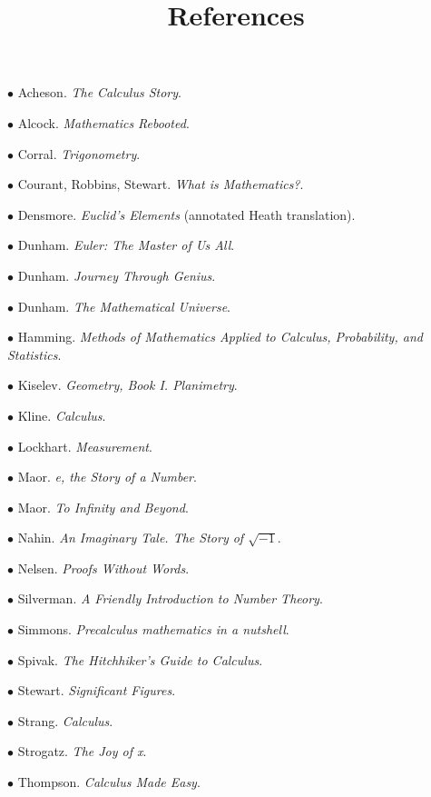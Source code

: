 \documentclass[11pt, oneside]{article}   	%
\title{References}
\date{}
\begin{document}
\maketitle
\Large


$\bullet$ Acheson.  \emph{The Calculus Story}.

$\bullet$ Alcock. \emph{Mathematics Rebooted}.

$\bullet$ Corral. \emph{Trigonometry}.

$\bullet$ Courant, Robbins, Stewart. \emph{What is Mathematics?}.

$\bullet$ Densmore. \emph{Euclid's Elements} (annotated Heath translation).

$\bullet$ Dunham. \emph{Euler:  The Master of Us All}.

$\bullet$ Dunham. \emph{Journey Through Genius}.

$\bullet$ Dunham. \emph{The Mathematical Universe}.

$\bullet$ Hamming.  \emph{Methods of Mathematics Applied to Calculus, Probability, and Statistics}.

$\bullet$ Kiselev. \emph{Geometry, Book I. Planimetry}.

$\bullet$ Kline. \emph{Calculus}.

$\bullet$ Lockhart. \emph{Measurement}.

$\bullet$ Maor. \emph{e, the Story of a Number}.

$\bullet$ Maor. \emph{To Infinity and Beyond}.

$\bullet$ Nahin. \emph{An Imaginary Tale.  The Story of $\sqrt{-1}$}.

$\bullet$ Nelsen. \emph{Proofs Without Words}.

$\bullet$ Silverman.  \emph{A Friendly Introduction to Number Theory}.

$\bullet$ Simmons.  \emph{Precalculus mathematics in a nutshell}.

$\bullet$ Spivak.  \emph{The Hitchhiker's Guide to Calculus}.

$\bullet$ Stewart.  \emph{Significant Figures}.

$\bullet$ Strang.  \emph{Calculus}.

$\bullet$ Strogatz.  \emph{The Joy of x}.

$\bullet$ Thompson.  \emph{Calculus Made Easy}.
\end{document}
